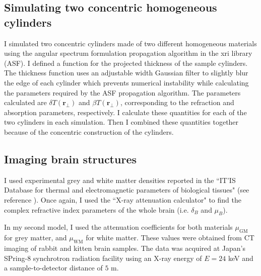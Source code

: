 \documentclass[10pt, a4paper, singlespacing]{report}
\begin{document}

\subsection{Simulating two concentric homogeneous cylinders}\label{2 cylinders}

I simulated two concentric cylinders made of two different homogeneous materials using the angular spectrum formulation propagation algorithm in the xri library (ASF). I defined a function for the projected thickness of the sample cylinders. The thickness function uses an adjustable width Gaussian filter to slightly blur the edge of each cylinder which prevents numerical instability while calculating the parameters required by the ASF propagation algorithm. The parameters calculated are $\delta T(\mathbf{r}_{\perp})$ and $\beta T(\mathbf{r}_{\perp})$, corresponding to the refraction and absorption parameters, respectively. I calculate these quantities for each of the two cylinders in each simulation. Then I combined these quantities together because of the concentric construction of the cylinders.


\subsection{Imaging brain structures}\label{Brainz}

I used experimental grey and white matter densities reported in the ``IT’IS Database for thermal and electromagnetic parameters of biological tissues" (see reference \cite{ITIS}). Once again, I used the ``X-ray attenuation calculator" to find the complex refractive index parameters of the whole brain (i.e. $\delta_B$ and $\mu_B$). 

In my second model, I used the attenuation coefficients for both materials $\mu_{\mathrm{GM}}$ for grey matter, and $\mu_{\mathrm{WM}}$ for white matter. These values were obtained from CT imaging of rabbit and kitten brain samples. The data was acquired at Japan's SPring-8 synchrotron radiation facility using an X-ray energy of $E = 24$ keV and a sample-to-detector distance of $5$ m\cite{Linda}.
\end{document}
